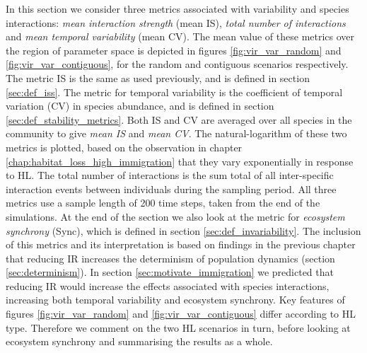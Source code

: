 In this section we consider three metrics associated with variability and species interactions: \emph{mean interaction strength} (mean IS), \emph{total number of interactions} and \emph{mean temporal variability} (mean CV). The mean value of these metrics over the region of parameter space is depicted in figures \ref{fig:vir_var_random} and \ref{fig:vir_var_contiguous}, for the random and contiguous scenarios respectively. The metric IS is the same as used previously, and is defined in section \ref{sec:def_iss}. The metric for temporal variability is the coefficient of temporal variation (CV) in species abundance, and is defined in section \ref{sec:def_stability_metrics}. Both IS and CV are averaged over all species in the community to give \emph{mean IS} and \emph{mean CV}. The natural-logarithm of these two metrics is plotted, based on the observation in chapter \ref{chap:habitat_loss_high_immigration} that they vary exponentially in response to HL. The total number of interactions is the sum total of all inter-specific interaction events between individuals during the sampling period. All three metrics use a sample length of 200 time steps, taken from the end of the simulations. At the end of the section we also look at the metric for \emph{ecosystem synchrony} (Sync), which is defined in section \ref{sec:def_invariability}. The inclusion of this metrics and its interpretation  is based on findings in the previous chapter that reducing IR increases the determinism of population dynamics (section \ref{sec:determinism}). In section \ref{sec:motivate_immigration} we predicted that reducing IR would increase the effects associated with species interactions, increasing both temporal variability and ecosystem synchrony. Key features of figures \ref{fig:vir_var_random} and \ref{fig:vir_var_contiguous} differ according to HL type. Therefore we comment on the two HL scenarios in turn, before looking at ecosystem synchrony and summarising the results as a whole.

